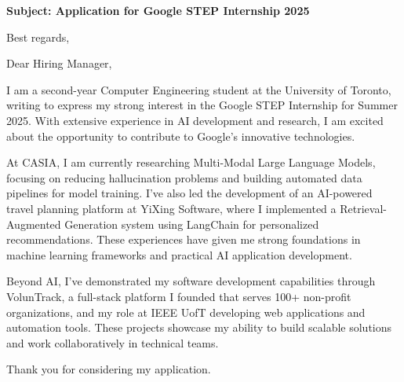 \documentclass[11pt,a4paper,roman]{moderncv}
\begin{document}
\date{\today}
\opening{\textbf{Subject: Application for Google STEP Internship 2025}}
\closing{Best regards,}

\makelettertitle

Dear Hiring Manager,

I am a second-year Computer Engineering student at the University of Toronto, writing to express my strong interest in the Google STEP Internship for Summer 2025. With extensive experience in AI development and research, I am excited about the opportunity to contribute to Google's innovative technologies.

At CASIA, I am currently researching Multi-Modal Large Language Models, focusing on reducing hallucination problems and building automated data pipelines for model training. I've also led the development of an AI-powered travel planning platform at YiXing Software, where I implemented a Retrieval-Augmented Generation system using LangChain for personalized recommendations. These experiences have given me strong foundations in machine learning frameworks and practical AI application development.

Beyond AI, I've demonstrated my software development capabilities through VolunTrack, a full-stack platform I founded that serves 100+ non-profit organizations, and my role at IEEE UofT developing web applications and automation tools. These projects showcase my ability to build scalable solutions and work collaboratively in technical teams.

Thank you for considering my application.

\makeletterclosing
\end{document}
